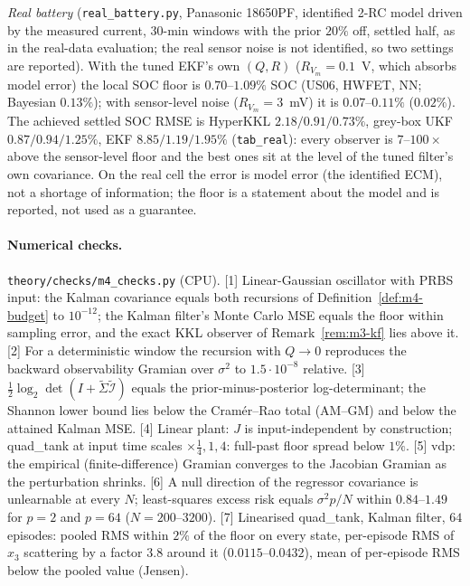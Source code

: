 \emph{Real battery} (\texttt{real\_battery.py}, Panasonic 18650PF, identified 2-RC model driven by the measured
current, 30-min windows with the prior $20\%$ off, settled half, as in the real-data evaluation; the real
sensor noise is not identified, so two settings are reported). With the tuned EKF's own $(Q,R)$ ($R_{V_m}=0.1$~V,
which absorbs model error) the local SOC floor is $0.70$--$1.09\%$ SOC (US06, HWFET, NN; Bayesian $0.13\%$);
with sensor-level noise ($R_{V_m}=3$~mV) it is $0.07$--$0.11\%$ ($0.02\%$). The achieved settled SOC RMSE is
HyperKKL $2.18/0.91/0.73\%$, grey-box UKF $0.87/0.94/1.25\%$, EKF $8.85/1.19/1.95\%$ (\texttt{tab\_real}): every
observer is $7$--$100\times$ above the sensor-level floor and the best ones sit at the level of the tuned filter's
own covariance. On the real cell the error is model error (the identified ECM), not a shortage of information;
the floor is a statement about the model and is reported, not used as a guarantee.

\paragraph{Numerical checks.} \texttt{theory/checks/m4\_checks.py} (CPU). [1] Linear-Gaussian oscillator with PRBS
input: the Kalman covariance equals both recursions of Definition~\ref{def:m4-budget} to $10^{-12}$; the Kalman
filter's Monte Carlo MSE equals the floor within sampling error, and the exact KKL observer of
Remark~\ref{rem:m3-kf} lies above it. [2] For a deterministic window the recursion with $Q\to0$ reproduces the
backward observability Gramian over $\sigma^2$ to $1.5\cdot10^{-8}$ relative. [3] $\tfrac12\log_2\det(I+\tilde\Sigma\tilde{\mathcal I})$
equals the prior-minus-posterior log-determinant; the Shannon lower bound lies below the Cram\'er--Rao total
(AM--GM) and below the attained Kalman MSE. [4] Linear plant: $J$ is input-independent by construction;
quad\_tank at input time scales $\times\tfrac14,1,4$: full-past floor spread below $1\%$. [5] vdp: the empirical
(finite-difference) Gramian converges to the Jacobian Gramian as the perturbation shrinks. [6] A null direction
of the regressor covariance is unlearnable at every $N$; least-squares excess risk equals $\sigma^2p/N$ within
$0.84$--$1.49$ for $p=2$ and $p=64$ ($N=200$--$3200$). [7] Linearised quad\_tank, Kalman filter, $64$ episodes: pooled RMS within $2\%$
of the floor on every state, per-episode RMS of $x_3$ scattering by a factor $3.8$ around it ($0.0115$--$0.0432$), mean of per-episode RMS
below the pooled value (Jensen).

